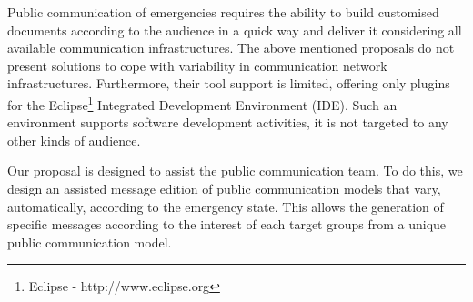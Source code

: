 Public communication of emergencies requires the ability to build customised documents according to the audience in a quick way and deliver it considering all available communication infrastructures. The above mentioned proposals do not present solutions to cope with variability in communication network infrastructures. Furthermore, their tool support is limited, offering only plugins for the Eclipse\footnote{Eclipse - http://www.eclipse.org} Integrated Development Environment (IDE). Such an environment supports software development activities, it is not targeted to any other kinds of audience.

Our proposal is designed to assist the public communication team. To do this, we design an assisted message edition of public communication models that vary, automatically, according to the emergency state. This allows the generation of specific messages according to the interest of each target groups from a unique public communication model.